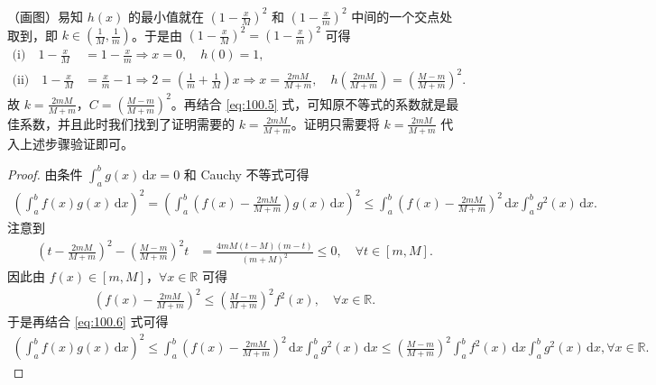 \documentclass[../../main.tex]{subfiles}%
\begin{document}
\begin{remark}
（画图）易知 \(h(x)\) 的最小值就在 \(\left( 1 - \frac{x}{M} \right)^2\) 和 \(\left( 1 - \frac{x}{m} \right)^2\) 中间的一个交点处取到，即 \(k \in \left( \frac{1}{M}, \frac{1}{m} \right)\)。于是由 \(\left( 1 - \frac{x}{M} \right)^2 = \left( 1 - \frac{x}{m} \right)^2\) 可得
\begin{align*}
\text{(i)} \quad 1 - \frac{x}{M} &= 1 - \frac{x}{m} \Longrightarrow x = 0, \quad h(0) = 1, \\
\text{(ii)} \quad 1 - \frac{x}{M} &= \frac{x}{m} - 1 \Longrightarrow 2 = \left( \frac{1}{m} + \frac{1}{M} \right) x \Longrightarrow x = \frac{2mM}{M + m}, \quad h\left( \frac{2mM}{M + m} \right) = \left( \frac{M - m}{M + m} \right)^2.
\end{align*}
故 \(k = \frac{2mM}{M + m}\)，\(C = \left( \frac{M - m}{M + m} \right)^2\)。再结合 \eqref{eq:100.5} 式，可知原不等式的系数就是最佳系数，并且此时我们找到了证明需要的 \(k = \frac{2mM}{M + m}\)。证明只需要将 \(k = \frac{2mM}{M + m}\) 代入上述步骤验证即可。
\end{remark}
\begin{proof}
由条件 \(\int_a^b g(x) \, \mathrm{d}x = 0\) 和 Cauchy 不等式可得
\begin{align}
\left( \int_a^b f(x) g(x) \, \mathrm{d}x \right)^2 = \left( \int_a^b \left( f(x) - \frac{2mM}{M + m} \right) g(x) \, \mathrm{d}x \right)^2 
\leqslant \int_a^b \left( f(x) - \frac{2mM}{M + m} \right)^2 \, \mathrm{d}x \int_a^b g^2(x) \, \mathrm{d}x. \label{eq:100.6}
\end{align}
注意到
\begin{align*}
\left( t - \frac{2mM}{M + m} \right)^2 - \left( \frac{M - m}{M + m} \right)^2 t &= \frac{4mM \left( t - M \right) \left( m - t \right)}{\left( m + M \right)^2} \leqslant 0, \quad \forall t \in [m, M].
\end{align*}
因此由 \(f(x) \in [m, M]\)，\(\forall x \in \mathbb{R}\) 可得
\begin{align*}
\left( f(x) - \frac{2mM}{M + m} \right)^2 \leqslant \left( \frac{M - m}{M + m} \right)^2 f^2(x), \quad \forall x \in \mathbb{R}.
\end{align*}
于是再结合 \eqref{eq:100.6} 式可得
\begin{align*}
\left( \int_a^b f(x) g(x) \, \mathrm{d}x \right)^2 \leqslant \int_a^b \left( f(x) - \frac{2mM}{M + m} \right)^2 \, \mathrm{d}x \int_a^b g^2(x) \, \mathrm{d}x 
\leqslant \left( \frac{M - m}{M + m} \right)^2 \int_a^b f^2(x) \, \mathrm{d}x \int_a^b g^2(x) \, \mathrm{d}x, \forall x \in \mathbb{R}.
\end{align*}
\end{proof}
\end{document}
